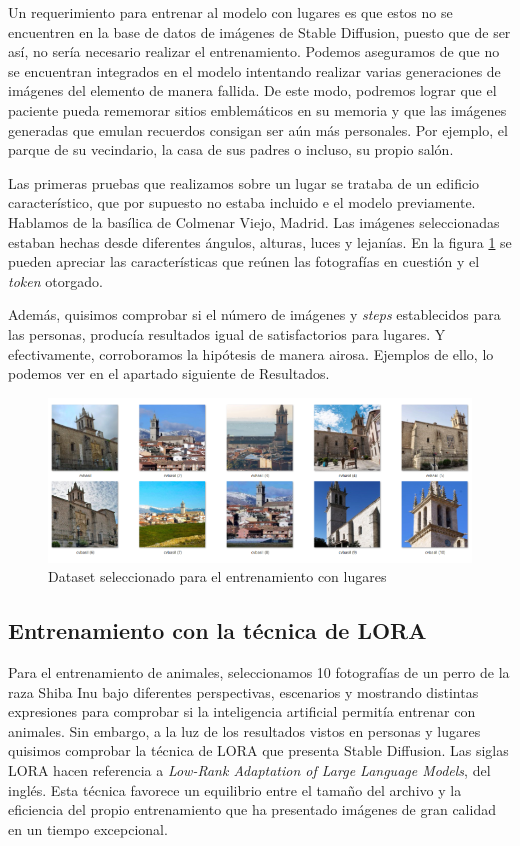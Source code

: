 Un requerimiento para entrenar al modelo con lugares es que estos no se encuentren en la base de datos de imágenes de Stable Diffusion, puesto que de ser así, no sería necesario realizar el entrenamiento. Podemos aseguramos de que no se encuentran integrados en el modelo intentando realizar varias generaciones de imágenes del elemento de manera fallida. De este modo, podremos lograr que el paciente pueda rememorar sitios emblemáticos en su memoria y que las imágenes generadas que emulan recuerdos consigan ser aún más personales. Por ejemplo, el parque de su vecindario, la casa de sus padres o incluso, su propio salón. 

Las primeras pruebas que realizamos sobre un lugar se trataba de un edificio característico, que por supuesto no estaba incluido e el modelo previamente. Hablamos de la basílica de Colmenar Viejo, Madrid. Las imágenes seleccionadas estaban hechas desde diferentes ángulos, alturas, luces y lejanías. En la figura \ref{fig:datasetcolme} se pueden apreciar las características que reúnen las fotografías en cuestión y el \textit{token} otorgado.

Además, quisimos comprobar si el número de imágenes y \textit{steps} establecidos para las personas, producía resultados igual de satisfactorios para lugares. Y efectivamente, corroboramos la hipótesis de manera airosa. Ejemplos de ello, lo podemos ver en el apartado siguiente de Resultados.  

\begin{figure}[!htb]
	\centering
	\includegraphics[width = 0.7
	\textwidth]{Imagenes/Vectorial/dataset_colmenar.png}
	\caption{Dataset seleccionado para el entrenamiento con lugares}
	\label{fig:datasetcolme}
\end{figure}


\subsection{Entrenamiento con la técnica de LORA}

Para el entrenamiento de animales, seleccionamos 10 fotografías de un perro de la raza Shiba Inu bajo diferentes perspectivas, escenarios y mostrando distintas expresiones para comprobar si la inteligencia artificial permitía entrenar con animales. Sin embargo, a la luz de los resultados vistos en personas y lugares quisimos comprobar la técnica de LORA que presenta Stable Diffusion. Las siglas LORA hacen referencia a \textit{Low-Rank Adaptation of Large Language Models}, del inglés. Esta técnica favorece un equilibrio entre el tamaño del archivo y la eficiencia del propio entrenamiento que ha presentado imágenes de gran calidad en un tiempo excepcional. 


